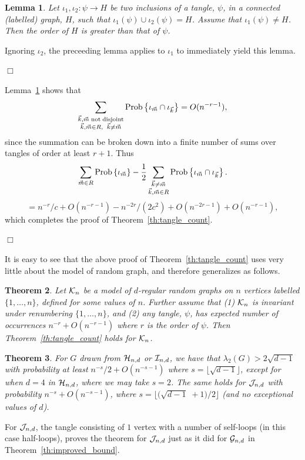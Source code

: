 \documentclass[12pt]{article}
\newtheorem{theorem}{Theorem}[section]
\newtheorem{lemma}[theorem]{Lemma}
\newcommand{\from}{\colon}
\newcommand{\ck}{{\cal K}}
\newcommand{\cg}{{\cal G}}
\newcommand{\ch}{{\cal H}}
\newcommand{\ci}{{\cal I}}
\newcommand{\cj}{{\cal J}}
\newcommand{\cjnd}{\cj_{n,d}}
\newcommand{\cind}{\ci_{n,d}}
\newcommand{\cgnd}{\cg_{n,d}}
\newcommand{\chnd}{\ch_{n,d}}
\newcommand{\tang}{{\psi}}	%
\newcommand{\intn}{{\{1,\ldots,n\}}}
\newcommand{\prob}[1]{{\rm Prob}\left\{ #1 \right\} }
\newcommand{\proof}{{\par\noindent {\bf Proof}\space\space}}
\newcommand{\proofbox}{\begin{flushright}$\Box$\end{flushright}}
\begin{document}
\begin{lemma}\label{lm:order_greater}
Let $\iota_1,\iota_2\from \tang\to H$ be two inclusions
of a tangle, $\tang$, in a connected (labelled) graph,
$H$, such that $\iota_1(\tang)\cup\iota_2(\tang)=H$.
Assume that $\iota_1(\tang)\ne H$.  Then the order of $H$ is greater
than that of $\tang$.
\end{lemma}
\proof Ignoring $\iota_2$, the preceeding lemma applies to $\iota_1$
to immediately yield this lemma.
\proofbox

Lemma~\ref{lm:order_greater} shows that
$$
\sum_{\substack{ {\vec k},{\vec m}\;{\rm not\;disjoint}
\\ {\vec k},{\vec m}\in R,\;\;{\vec k}\ne{\vec m}}}
\prob{\iota_{\vec m}\cap\iota_{\vec k}} = O(n^{-r-1}),
$$
since the summation can be broken down into a finite number of sums
over tangles of order at least $r+1$.  Thus
$$
\sum_{{\vec m}\in R} \prob{\iota_{\vec m}} - 
\frac{1}{2}\sum_{\substack{ {\vec k}\ne {\vec m} \\ {\vec k},{\vec m}\in R}}
\prob{\iota_{\vec m}\cap\iota_{\vec k}}.
$$
$$
= n^{-r}/c+O(n^{-r-1})- n^{-2r}/(2c^2) + O(n^{-2r-1})+O(n^{-r-1}),
$$
which completes the proof of Theorem~\ref{th:tangle_count}.
\proofbox

It is easy to see that the above proof of Theorem~\ref{th:tangle_count}
uses very little about the model of random graph, and therefore generalizes
as follows.
\begin{theorem} Let $\ck_n$ be a model of $d$-regular random graphs on
$n$ vertices labelled $\intn$,
defined for some values of $n$.  Further assume that
(1) $\ck_n$ is invariant under renumbering $\intn$, and (2) any
tangle, $\tang$, has expected number of occurrences $n^{-r}+O(n^{-r-1})$
where $r$ is the order of $\tang$.  Then Theorem~\ref{th:tangle_count} holds
for $\ck_n$.
\end{theorem}


\begin{theorem}\label{th:other_ss}
For $G$ drawn from $\chnd$ or
$\cind$, we have that $\lambda_2(G)>2\sqrt{d-1}$
with probability at least $n^{-s}/2+O(n^{-s-1})$ where
$s=\lfloor \sqrt{d-1}\rfloor$, except for when $d=4$ in $\chnd$, where
we may take $s=2$.  The same holds for $\cjnd$ with probability
$n^{-s}+O(n^{-s-1})$, where
$s=\lfloor \bigl(\sqrt{d-1}\;+1\bigr)/2
\rfloor$ (and no exceptional values of $d$).
\end{theorem}
\proof 
For $\cjnd$, the tangle consisting of $1$ vertex with a number of self-loops
(in this case half-loops), proves the theorem for $\cjnd$ just as it
did for $\cgnd$ in Theorem~\ref{th:improved_bound}.
\end{document}
